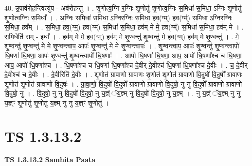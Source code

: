 \documentclass[17pt]{extarticle}
\begin{document}
40. उ॒पाव॑रोह॒न्त्वित्यु॑प - अव॑रोहन्तु । . शृ॒णोत्व॒ग्नि र॒ग्निः शृ॒णोतु॑ शृ॒णोत्व॒ग्निः स॒मिधा॑ स॒मिधा॒ ऽग्निः शृ॒णोतु॑ शृ॒णोत्व॒ग्निः स॒मिधा᳚ । . अ॒ग्निः स॒मिधा॑ स॒मिधा॒ ऽग्निर॒ग्निः स॒मिधा॒ हव॒(ग्म्॒) हव(ग्म्॑) स॒मिधा॒ ऽग्निर॒ग्निः स॒मिधा॒ हव᳚म् । . स॒मिधा॒ हव॒(ग्म्॒) हव(ग्म्॑) स॒मिधा॑ स॒मिधा॒ हव॑म् मे मे॒ हव(ग्म्॑) स॒मिधा॑ स॒मिधा॒ हव॑म् मे । . स॒मिधेति॑ सम् - इधा᳚ । . हव॑म् मे मे॒ हव॒(ग्म्॒) हव॑म् मे शृ॒ण्वन्तु॑ शृ॒ण्वन्तु॑ मे॒ हव॒(ग्म्॒) हव॑म् मे शृ॒ण्वन्तु॑ । . मे॒ शृ॒ण्वन्तु॑ शृ॒ण्वन्तु॑ मे मे शृ॒ण्वन्त्वाप॒ आपः॑ शृ॒ण्वन्तु॑ मे मे शृ॒ण्वन्त्वापः॑ । . शृ॒ण्वन्त्वाप॒ आपः॑ शृ॒ण्वन्तु॑ शृ॒ण्वन्त्वापो॑ धि॒षणा॑ धि॒षणा॒ आपः॑ शृ॒ण्वन्तु॑ शृ॒ण्वन्त्वापो॑ धि॒षणाः᳚ । . आपो॑ धि॒षणा॑ धि॒षणा॒ आप॒ आपो॑ धि॒षणा᳚श्च च धि॒षणा॒ आप॒ आपो॑ धि॒षणा᳚श्च । . धि॒षणा᳚श्च च धि॒षणा॑ धि॒षणा᳚श्च दे॒वीर् दे॒वीश्च॑ धि॒षणा॑ धि॒षणा᳚श्च दे॒वीः । . च॒ दे॒वीर् दे॒वीश्च॑ च दे॒वीः । . दे॒वीरिति॑ दे॒वीः । . शृ॒णोत॑ ग्रावाणो ग्रावाणः शृ॒णोत॑ शृ॒णोत॑ ग्रावाणो वि॒दुषो॑ वि॒दुषो᳚ ग्रावाणः शृ॒णोत॑ शृ॒णोत॑ ग्रावाणो वि॒दुषः॑ । . ग्रा॒वा॒णो॒ वि॒दुषो॑ वि॒दुषो᳚ ग्रावाणो ग्रावाणो वि॒दुषो॒ नु नु वि॒दुषो᳚ ग्रावाणो ग्रावाणो वि॒दुषो॒ नु । . वि॒दुषो॒ नु नु वि॒दुषो॑ वि॒दुषो॒ नु य॒ज्ञ्ं ॅय॒ज्ञ्म् नु वि॒दुषो॑ वि॒दुषो॒ नु य॒ज्ञ्म् । . नु य॒ज्ञ्ं ॅय॒ज्ञ्म् नु नु य॒ज्ञ्ꣳ शृ॒णोतु॑ शृ॒णोतु॑ य॒ज्ञ्म् नु नु य॒ज्ञ्ꣳ शृ॒णोतु॑ । \newline
\pagebreak
{}
\section*{ TS 1.3.13.2 }

\textbf{TS 1.3.13.2 } \newline
\textbf{Samhita Paata} \newline
\end{document}
